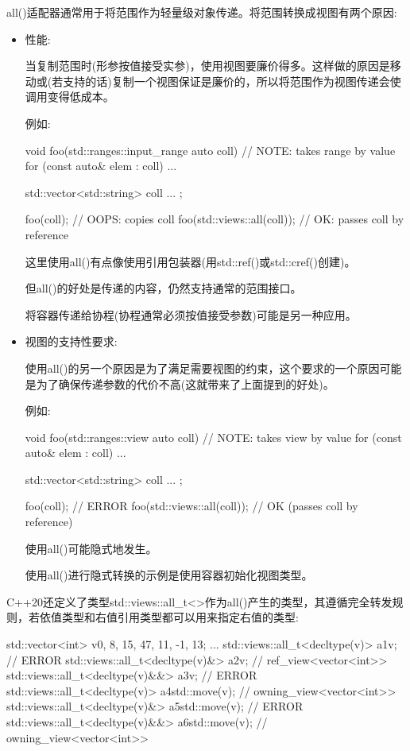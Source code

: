 all()适配器通常用于将范围作为轻量级对象传递。将范围转换成视图有两个原因:

\begin{itemize}
\item
性能:

当复制范围时(形参按值接受实参)，使用视图要廉价得多。这样做的原因是移动或(若支持的话)复制一个视图保证是廉价的，所以将范围作为视图传递会使调用变得低成本。

例如:

\begin{cpp}
void foo(std::ranges::input_range auto coll) // NOTE: takes range by value
{
	for (const auto& elem : coll) {
		...
	}
}

std::vector<std::string> coll{ ... };

foo(coll); // OOPS: copies coll
foo(std::views::all(coll)); // OK: passes coll by reference
\end{cpp}

这里使用all()有点像使用引用包装器(用std::ref()或std::cref()创建)。

但all()的好处是传递的内容，仍然支持通常的范围接口。

将容器传递给协程(协程通常必须按值接受参数)可能是另一种应用。

\item
视图的支持性要求:

使用all()的另一个原因是为了满足需要视图的约束，这个要求的一个原因可能是为了确保传递参数的代价不高(这就带来了上面提到的好处)。

例如:

\begin{cpp}
void foo(std::ranges::view auto coll) // NOTE: takes view by value
{
	for (const auto& elem : coll) {
		...
	}
}

std::vector<std::string> coll{ ... };

foo(coll); // ERROR
foo(std::views::all(coll)); // OK (passes coll by reference)
\end{cpp}

使用all()可能隐式地发生。

使用all()进行隐式转换的示例是使用容器初始化视图类型。
\end{itemize}


C++20还定义了类型std::views::all\_t<>作为all()产生的类型，其遵循完全转发规则，若依值类型和右值引用类型都可以用来指定右值的类型:

\begin{cpp}
std::vector<int> v{0, 8, 15, 47, 11, -1, 13};
...
std::views::all_t<decltype(v)> a1{v}; // ERROR
std::views::all_t<decltype(v)&> a2{v}; // ref_view<vector<int>>
std::views::all_t<decltype(v)&&> a3{v}; // ERROR
std::views::all_t<decltype(v)> a4{std::move(v)}; // owning_view<vector<int>>
std::views::all_t<decltype(v)&> a5{std::move(v)}; // ERROR
std::views::all_t<decltype(v)&&> a6{std::move(v)}; // owning_view<vector<int>>
\end{cpp}


